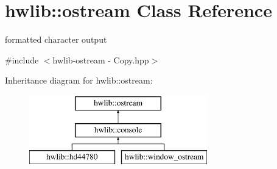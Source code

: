 \hypertarget{classhwlib_1_1ostream}{}\section{hwlib\+:\+:ostream Class Reference}
\label{classhwlib_1_1ostream}


formatted character output  




{\ttfamily \#include $<$hwlib-\/ostream -\/ Copy.\+hpp$>$}

Inheritance diagram for hwlib\+:\+:ostream\+:\begin{figure}[H]
\begin{center}
\leavevmode
\includegraphics[height=3.000000cm]{classhwlib_1_1ostream}
\end{center}
\end{figure}
